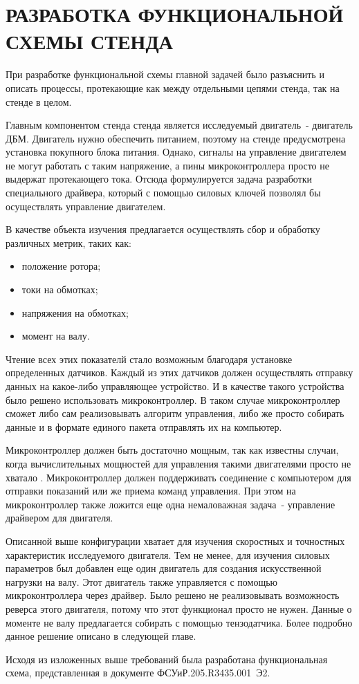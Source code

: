 \section{РАЗРАБОТКА ФУНКЦИОНАЛЬНОЙ СХЕМЫ СТЕНДА}

При разработке функциональной схемы главной задачей было разъяснить и описать
процессы, протекающие как между отдельными цепями стенда, так на стенде в целом.

Главным компонентом стенда стенда является исследуемый двигатель~- двигатель ДБМ. Двигатель нужно
обеспечить питанием, поэтому на стенде предусмотрена установка покупного блока питания.
Однако, сигналы на управление двигателем не могут работать с таким напряжение, а
пины микроконтроллера просто не выдержат протекающего тока. Отсюда формулируется
задача разработки специального драйвера, который с помощью силовых ключей позволял бы
осуществлять управление двигателем.

В качестве объекта изучения предлагается осуществлять сбор и обработку различных метрик, таких как:
\begin{itemize}
  \item положение ротора;
  \item токи на обмотках;
  \item напряжения на обмотках;
  \item момент на валу.
\end{itemize}

Чтение всех этих показателй стало возможным благодаря установке определенных датчиков. Каждый из этих датчиков
должен осуществлять отправку данных на какое-либо управляющее устройство. И в качестве такого
устройства было решено использовать микроконтроллер. В таком случае микроконтроллер сможет
либо сам реализовывать алгоритм управления, либо же просто собирать данные и в формате 
единого пакета отправлять их на компьютер.

Микроконтроллер должен быть достаточно мощным, так как известны случаи, когда вычислительных
мощностей для управления такими двигателями просто не хватало \cite{tooslow}. 
Микроконтроллер должен поддерживать соединение с компьютером для отправки показаний или же
приема команд управления.
При этом на микроконтроллер также ложится еще одна немаловажная задача~- управление драйвером
для двигателя.

Описанной выше конфигурации хватает для изучения скоростных и точностных характеристик исследуемого
двигателя. Тем не менее, для изучения силовых параметров был добавлен еще один двигатель
для создания искусственной нагрузки на валу. Этот двигатель также управляется
с помощью микроконтроллера через драйвер. Было решено не реализовывать возможность реверса этого
двигателя, потому что этот функционал просто не нужен. Данные о моменте не валу предлагается собирать 
с помощью тензодатчика. Более подробно данное решение описано в следующей главе.

Исходя из изложенных выше требований была разработана функциональная схема, представленная в
документе \mbox{ФСУиР.205.R3435.001 Э2}. 